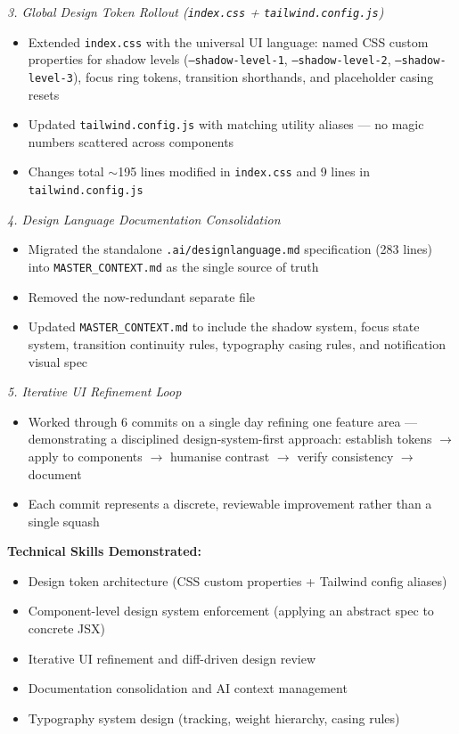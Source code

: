 \documentclass[11pt,a4paper]{article}
\begin{document}
\textit{3. Global Design Token Rollout (\texttt{index.css} + \texttt{tailwind.config.js})}
\begin{itemize}
  \item Extended \texttt{index.css} with the universal UI language: named CSS custom
        properties for shadow levels (\texttt{--shadow-level-1},
        \texttt{--shadow-level-2}, \texttt{--shadow-level-3}), focus ring tokens,
        transition shorthands, and placeholder casing resets
  \item Updated \texttt{tailwind.config.js} with matching utility aliases — no magic numbers
        scattered across components
  \item Changes total $\sim$195 lines modified in \texttt{index.css} and 9 lines in
        \texttt{tailwind.config.js}
\end{itemize}

\textit{4. Design Language Documentation Consolidation}
\begin{itemize}
  \item Migrated the standalone \texttt{.ai/designlanguage.md} specification (283 lines) into
        \texttt{MASTER\_CONTEXT.md} as the single source of truth
  \item Removed the now-redundant separate file
  \item Updated \texttt{MASTER\_CONTEXT.md} to include the shadow system, focus state system,
        transition continuity rules, typography casing rules, and notification visual spec
\end{itemize}

\textit{5. Iterative UI Refinement Loop}
\begin{itemize}
  \item Worked through 6 commits on a single day refining one feature area — demonstrating a
        disciplined design-system-first approach: establish tokens $\rightarrow$ apply to
        components $\rightarrow$ humanise contrast $\rightarrow$ verify consistency
        $\rightarrow$ document
  \item Each commit represents a discrete, reviewable improvement rather than a single squash
\end{itemize}

\textbf{Technical Skills Demonstrated:}
\begin{itemize}
  \item Design token architecture (CSS custom properties + Tailwind config aliases)
  \item Component-level design system enforcement (applying an abstract spec to concrete JSX)
  \item Iterative UI refinement and diff-driven design review
  \item Documentation consolidation and AI context management
  \item Typography system design (tracking, weight hierarchy, casing rules)
\end{itemize}
\end{document}
